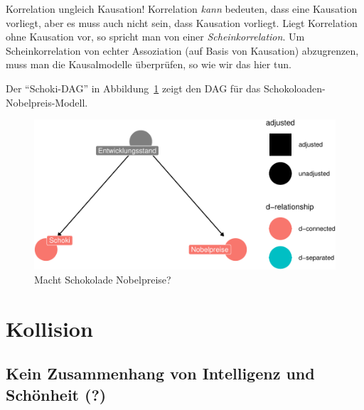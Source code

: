 \documentclass[
  a4paper,
  DIV=11]{scrreprt}
\theoremstyle{definition}
\theoremstyle{remark}
\begin{document}
\begin{tcolorbox}[enhanced jigsaw, left=2mm, colframe=quarto-callout-important-color-frame, opacityback=0, arc=.35mm, rightrule=.15mm, breakable, toptitle=1mm, colbacktitle=quarto-callout-important-color!10!white, colback=white, coltitle=black, bottomrule=.15mm, titlerule=0mm, opacitybacktitle=0.6, bottomtitle=1mm, title=\textcolor{quarto-callout-important-color}{\faExclamation}\hspace{0.5em}{Wichtig}, toprule=.15mm, leftrule=.75mm]
Korrelation ungleich Kausation! Korrelation \emph{kann} bedeuten, dass
eine Kausation vorliegt, aber es muss auch nicht sein, dass Kausation
vorliegt. Liegt Korrelation ohne Kausation vor, so spricht man von einer
\emph{Scheinkorrelation}. Um Scheinkorrelation von echter Assoziation
(auf Basis von Kausation) abzugrenzen, muss man die Kausalmodelle
überprüfen, so wie wir das hier tun.
\end{tcolorbox}

Der ``Schoki-DAG'' in Abbildung~\ref{fig-schoki-dag} zeigt den DAG für
das Schokoloaden-Nobelpreis-Modell.

\begin{figure}

{\centering \includegraphics{./kausal_files/figure-pdf/fig-schoki-dag-1.pdf}

}

\caption{\label{fig-schoki-dag}Macht Schokolade Nobelpreise?}

\end{figure}

\hypertarget{kollision}{%
\section{Kollision}\label{kollision}}

\hypertarget{kein-zusammenhang-von-intelligenz-und-schuxf6nheit}{%
\subsection{Kein Zusammenhang von Intelligenz und Schönheit
(?)}\label{kein-zusammenhang-von-intelligenz-und-schuxf6nheit}}
\end{document}
